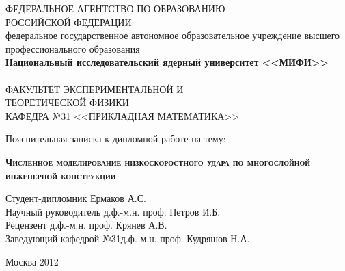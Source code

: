 \begin{titlepage}
\newpage

\begin{center}
ФЕДЕРАЛЬНОЕ АГЕНТСТВО ПО ОБРАЗОВАНИЮ\\РОССИЙСКОЙ ФЕДЕРАЦИИ\\
федеральное государственное автономное образовательное учреждение высшего профессионального образования \\
\textbf{Национальный исследовательский ядерный университет <<МИФИ>>}\\
\hrulefill\\
ФАКУЛЬТЕТ ЭКСПЕРИМЕНТАЛЬНОЙ И\\ТЕОРЕТИЧЕСКОЙ ФИЗИКИ\\
\vspace{1cm}
КАФЕДРА №31 <<ПРИКЛАДНАЯ МАТЕМАТИКА>>\\
\end{center}

\vspace{2em}

\begin{center}
\Large Пояснительная записка к дипломной работе на тему:
\end{center}

\vspace{0.5em}

\begin{center}
\textsc{\textbf{Численное моделирование низкоскоростного удара по многослойной инженерной конструкции}}
\end{center}

\vspace{3em}

\begin{flushleft}
\vspace{1.5em}
Студент-дипломник \hrulefill Ермаков А.С.\\
\vspace{1.5em}
Научный руководитель \hrulefill д.ф.-м.н. проф. Петров И.Б.\\
\vspace{1.5em}
Рецензент \hrulefill д.ф.-м.н. проф. Крянев А.В. \\
\vspace{1.5em}
Заведующий кафедрой №31\hrulefill д.ф.-м.н. проф. Кудряшов Н.А.\\
\end{flushleft}

\vspace{\fill}
\begin{center}
Москва 2012
\end{center}

\end{titlepage}
